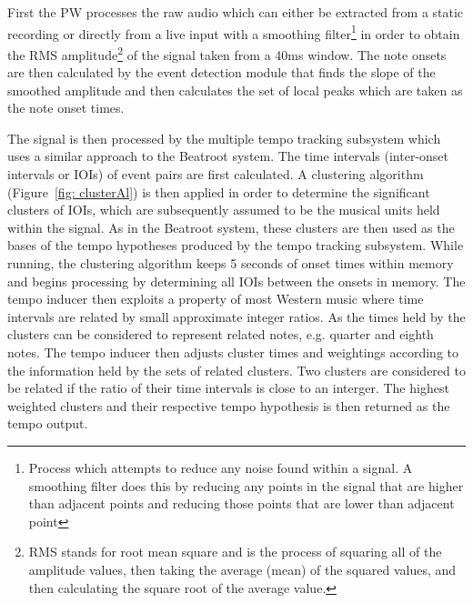 \documentclass[a4paper, 11pt]{article}
\begin{document}
First the PW processes the raw audio which can either be extracted from a static recording or directly from a live input with a smoothing filter\footnote{Process which attempts to reduce any noise found within a signal. A smoothing filter does this by reducing any points in the signal that are higher than adjacent points and reducing those points that are lower than adjacent point\cite{pragmaticSig}} in order to obtain the RMS amplitude\footnote{RMS stands for root mean square and is the process of squaring all of the amplitude values, then taking the average (mean) of the squared values, and then calculating the square root of the average value\cite{rms}.} of the signal taken from a 40ms window. The note onsets are then calculated by the event detection module that finds the slope of the smoothed amplitude and then calculates the set of local peaks which are taken as the note onset times\cite{dixonGoeblWidmer}. 

The signal is then processed by the multiple tempo tracking subsystem which uses a similar approach to the Beatroot system. The time intervals (inter-onset intervals or IOIs) of event pairs are first calculated. A clustering algorithm (Figure~\ref{fig: clusterAl}) is then applied in order to determine the significant clusters of IOIs, which are subsequently assumed to be the musical units held within the signal. As in the Beatroot system, these clusters are then used as the bases of the tempo hypotheses produced by the tempo tracking subsystem. While running, the clustering algorithm keeps 5 seconds of onset times within memory and begins processing by determining all IOIs between the onsets in memory. The tempo inducer then exploits a property of most Western music where time intervals are related by small approximate integer ratios. As the times held by the clusters can be considered to represent related notes, e.g. quarter and eighth notes. The tempo inducer then adjusts cluster times and weightings according to the information held by the sets of related clusters. Two clusters are considered to be related if the ratio of their time intervals is close to an interger. The highest weighted clusters and their respective tempo hypothesis is then returned as the tempo output\cite{dixonGoeblWidmer}.
\end{document}

